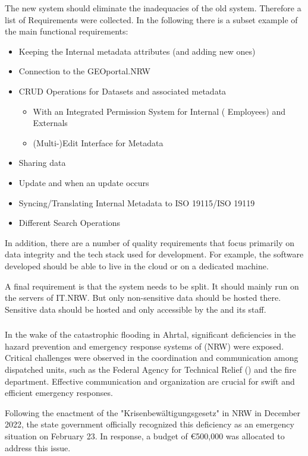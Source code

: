 \documentclass[11pt, titlepage, a4paper]{article}
\begin{document}
The new system should eliminate the inadequacies of the old system. Therefore a list of Requirements were collected. In the following there is a subset example of the main functional requirements:
\begin{itemize}
    \item Keeping the Internal metadata attributes (and adding new ones)
    \item Connection to the GEOportal.NRW
    \item CRUD Operations for Datasets and associated metadata
          \begin{itemize}
              \item With an Integrated Permission System for Internal ( Employees) and Externals
              \item (Multi-)Edit Interface for Metadata
          \end{itemize}
    \item Sharing data
    \item Update  and  when an update occurs
    \item Syncing/Translating Internal Metadata to ISO 19115/ISO 19119
    \item Different Search Operations
\end{itemize}

In addition, there are a number of quality requirements that focus primarily on data integrity and the tech stack used for development. For example, the software developed should be able to live in the cloud or on a dedicated machine.

A final requirement is that the system needs to be split. It should mainly run on the servers of IT.NRW. But only non-sensitive data should be hosted there. Sensitive data should be hosted and only accessible by the  and its staff.
\subsubsection{}
In the wake of the catastrophic flooding in Ahrtal, significant deficiencies in the hazard prevention and emergency response systems of (NRW) were exposed. Critical challenges were observed in the coordination and communication among dispatched units, such as the Federal Agency for Technical Relief () and the fire department. Effective communication and organization are crucial for swift and efficient emergency responses.

Following the enactment of the "Krisenbewältigungsgesetz" in NRW in December 2022, the state government officially recognized this deficiency as an emergency situation on February 23. In response, a budget of €500,000 was allocated to address this issue.
\end{document}
